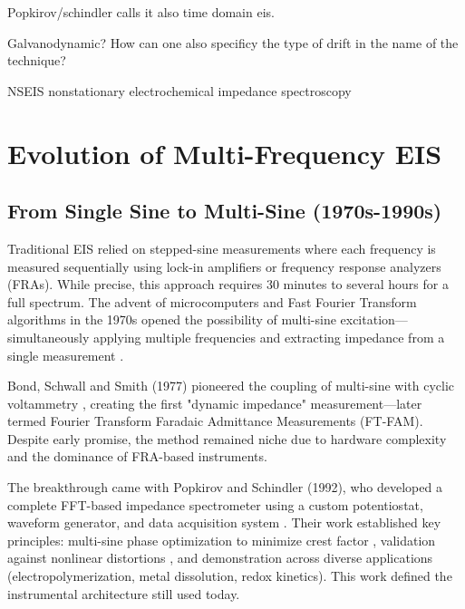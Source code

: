 Popkirov/schindler calls it also time domain eis.

Galvanodynamic? How can one also specificy the type of drift in the name of the technique?

NSEIS nonstationary electrochemical impedance spectroscopy



\section{Evolution of Multi-Frequency EIS}

\subsection{From Single Sine to Multi-Sine (1970s-1990s)}

Traditional EIS relied on stepped-sine measurements where each frequency is measured sequentially using lock-in amplifiers or frequency response analyzers (FRAs). While precise, this approach requires 30 minutes to several hours for a full spectrum. The advent of microcomputers and Fast Fourier Transform algorithms in the 1970s opened the possibility of multi-sine excitation—simultaneously applying multiple frequencies and extracting impedance from a single measurement \cite{kojima1971fourier, creasonFourierTransformFaradaic1972, gloverAlternatingCurrentPolarography1973}.

Bond, Schwall and Smith (1977) pioneered the coupling of multi-sine with cyclic voltammetry \cite{schwallOnlineFastFourier1977, bondOnlineFFTFaradaic1977}, creating the first "dynamic impedance" measurement—later termed Fourier Transform Faradaic Admittance Measurements (FT-FAM). Despite early promise, the method remained niche due to hardware complexity and the dominance of FRA-based instruments.

The breakthrough came with Popkirov and Schindler (1992), who developed a complete FFT-based impedance spectrometer using a custom potentiostat, waveform generator, and data acquisition system \cite{popkirovOptimizationPerturbationSignal1993a}. Their work established key principles: multi-sine phase optimization to minimize crest factor \cite{popkirovOptimizationPerturbationSignal1993a}, validation against nonlinear distortions \cite{popkirovValidationExperimentalData1993a}, and demonstration across diverse applications (electropolymerization, metal dissolution, redox kinetics). This work defined the instrumental architecture still used today.

